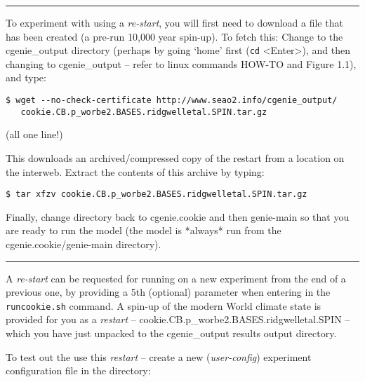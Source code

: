 \vspace{1mm}
\noindent\rule{4cm}{0.1mm}
\vspace{2mm}

\noindent To experiment with using a \textit{re-start}, you will first need to download a file that has been created (a pre-run 10,000 year spin-up). To fetch this: Change to the \textsf{\footnotesize cgenie\_output} directory (perhaps by going ‘home’ first (\texttt{cd} \textsf{\small <Enter>}), and then changing to \textsf{\footnotesize cgenie\_output} – refer to linux commands HOW-TO and Figure 1.1), and type:

\vspace{-2mm}\small
\begin{verbatim}
$ wget --no-check-certificate http://www.seao2.info/cgenie_output/
   cookie.CB.p_worbe2.BASES.ridgwelletal.SPIN.tar.gz
\end{verbatim}\normalsize
\vspace{-2mm}
(all one line!)

This downloads an archived/compressed copy of the restart from a location on the interweb. Extract the contents of this archive by typing:

\vspace{-2mm}\small
\begin{verbatim}
$ tar xfzv cookie.CB.p_worbe2.BASES.ridgwelletal.SPIN.tar.gz
\end{verbatim}\normalsize
\vspace{-2mm}

Finally, change directory back to \textsf{\footnotesize cgenie.cookie} and then \textsf{\footnotesize genie-main} so that you are ready to run the model (the model is *always* run from the \textsf{\footnotesize cgenie.cookie/genie-main} directory).

\vspace{1mm}
\noindent\rule{4cm}{0.1mm}
\vspace{2mm}

\noindent A \textit{re-start} can be requested for  running on a new experiment from the end of a previous one, by providing a 5th (optional) parameter when entering in the \texttt{runcookie.sh} command. A spin-up of the modern World climate state is provided for you as a \textit{restart} -- 
\textsf{\footnotesize cookie.CB.p\_worbe2.BASES.ridgwelletal.SPIN} -- which you have just unpacked to the \textsf{\footnotesize cgenie\_output} results output directory.

To test out the use this \textit{restart} -- create a new (\textit{user-config}) experiment configuration file in the directory: 

